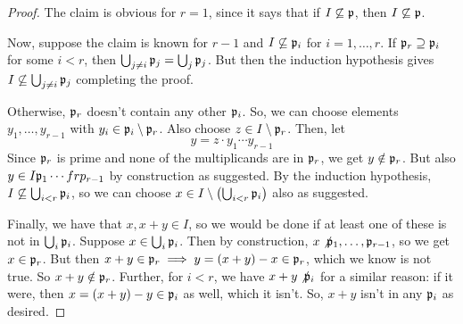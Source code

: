 \begin{proof}
	The claim is obvious for $r=1$, since it says that if $I \not\subseteq \mathfrak{p}$, then $I \not\subseteq \mathfrak{p}$.
	
	Now, suppose the claim is known for $r-1$ and $I \not\subseteq \mathfrak{p}_i$ for $i=1,\ldots,r$. If $\mathfrak{p}_r \supseteq \mathfrak{p}_i$ for some $i < r$, then $\bigcup_{j \neq i} \mathfrak{p}_j = \bigcup_j \mathfrak{p}_j$. But then the induction hypothesis gives $I \not\subseteq \bigcup_{j \neq i} \mathfrak{p}_j$ completing the proof.
	
	Otherwise, $\mathfrak{p}_r$ doesn't contain any other $\mathfrak{p}_i$. So, we can choose elements $y_1,\ldots,y_{r-1}$ with $y_i \in \mathfrak{p}_i \setminus \mathfrak{p}_r$. Also choose $z \in I \setminus \mathfrak{p}_r$. Then, let
	\[ y = z \cdot y_1 \cdots y_{r-1} \]
	Since $\mathfrak{p}_r$ is prime and none of the multiplicands are in $\mathfrak{p}_r$, we get $y \notin \mathfrak{p}_r$. But also $y \in I\mathfrak{p}_1 \cdots frp_{r-1}$ by construction as suggested. By the induction hypothesis, $I \not\subseteq \bigcup_{i < r} \mathfrak{p}_i$, so we can choose $x \in I \setminus \left(\bigcup_{i < r} \mathfrak{p}_i\right)$ also as suggested.
	
	Finally, we have that $x,x+y \in I$, so we would be done if at least one of these is not in $\bigcup_i \mathfrak{p}_i$. Suppose $x \in \bigcup_i \mathfrak{p}_i$. Then by construction, $x \not \mathfrak{p}_1,\ldots,\mathfrak{p}_{r-1}$, so we get $x \in \mathfrak{p}_r$. But then $x+y \in \mathfrak{p}_r \implies y = (x+y)-x \in \mathfrak{p}_r$, which we know is not true. So $x+y \notin \mathfrak{p}_r$. Further, for $i < r$, we have $x+y \not \mathfrak{p}_i$ for a similar reason: if it were, then $x = (x+y)-y \in \mathfrak{p}_i$ as well, which it isn't. So, $x+y$ isn't in any $\mathfrak{p}_i$ as desired.
\end{proof}
